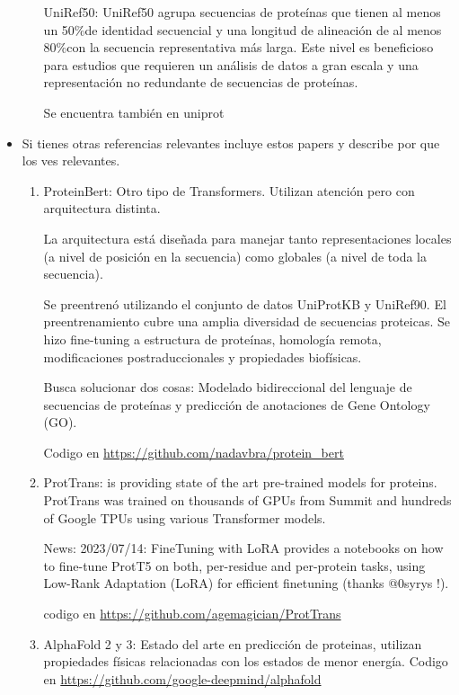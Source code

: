 \documentclass[11pt, twoside]{report}
\begin{document}
\begin{itemize}
\begin{enumerate}
        UniRef50: UniRef50 agrupa secuencias de proteínas que tienen al menos un 50$\% $de identidad secuencial y una longitud de alineación de al menos 80$\% $con la secuencia representativa más larga.  Este nivel es beneficioso para estudios que requieren un análisis de datos a gran escala y una representación no redundante de secuencias de proteínas.

        Se encuentra también en uniprot
    \end{enumerate}

    \item Si tienes otras referencias relevantes incluye estos papers y describe por que los ves relevantes.
    
    \begin{enumerate}
        \item ProteinBert: Otro tipo de Transformers. Utilizan atención pero con arquitectura distinta. 

        La arquitectura está diseñada para manejar tanto representaciones locales (a nivel de posición en la secuencia) como globales (a nivel de toda la secuencia).

        Se preentrenó utilizando el conjunto de datos UniProtKB y UniRef90. El preentrenamiento cubre una amplia diversidad de secuencias proteicas. Se hizo fine-tuning a estructura de proteínas, homología remota, modificaciones postraduccionales y propiedades biofísicas.

        Busca solucionar dos cosas: Modelado bidireccional del lenguaje de secuencias de proteínas y predicción de anotaciones de Gene Ontology (GO).
    

        Codigo en \url{https://github.com/nadavbra/protein_bert}


        \item ProtTrans: 
        is providing state of the art pre-trained models for proteins. ProtTrans was trained on thousands of GPUs from Summit and hundreds of Google TPUs using various Transformer models.

        News: 2023/07/14: FineTuning with LoRA provides a notebooks on how to fine-tune ProtT5 on both, per-residue and per-protein tasks, using Low-Rank Adaptation (LoRA) for efficient finetuning (thanks @0syrys !).

        
        codigo en \url{https://github.com/agemagician/ProtTrans}
    



        \item AlphaFold 2 y 3: Estado del arte en predicción de proteinas, utilizan propiedades físicas relacionadas con los estados de menor energía. Codigo en \url{https://github.com/google-deepmind/alphafold}
        

\end{enumerate}
\end{itemize}
\end{document}
